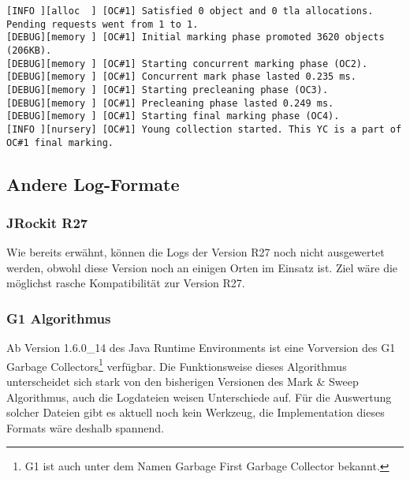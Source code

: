 \begin{lstlisting}[caption=Garbage Collection Log (Debug Informationen)]
[INFO ][alloc  ] [OC#1] Satisfied 0 object and 0 tla allocations. Pending requests went from 1 to 1.
[DEBUG][memory ] [OC#1] Initial marking phase promoted 3620 objects (206KB).
[DEBUG][memory ] [OC#1] Starting concurrent marking phase (OC2).
[DEBUG][memory ] [OC#1] Concurrent mark phase lasted 0.235 ms.
[DEBUG][memory ] [OC#1] Starting precleaning phase (OC3).
[DEBUG][memory ] [OC#1] Precleaning phase lasted 0.249 ms.
[DEBUG][memory ] [OC#1] Starting final marking phase (OC4).
[INFO ][nursery] [OC#1] Young collection started. This YC is a part of OC#1 final marking.
\end{lstlisting}

\subsection{Andere Log-Formate}
\subsubsection{JRockit R27}\label{analyseumfang_jr27}
Wie bereits erwähnt, können die Logs der Version R27 noch nicht ausgewertet werden, obwohl diese Version noch an einigen Orten im Einsatz ist. Ziel wäre die möglichst rasche Kompatibilität zur Version R27.

\subsubsection{G1 Algorithmus}
Ab Version 1.6.0\_14 des Java Runtime Environments ist eine Vorversion des G1 Garbage Collectors\footnote{G1 ist auch unter dem Namen Garbage First Garbage Collector bekannt.} verfügbar. Die Funktionsweise dieses Algorithmus unterscheidet sich stark von den bisherigen Versionen des Mark \& Sweep Algorithmus, auch die Logdateien weisen Unterschiede auf. Für die Auswertung solcher Dateien gibt es aktuell noch kein Werkzeug, die Implementation dieses Formats wäre deshalb spannend.







